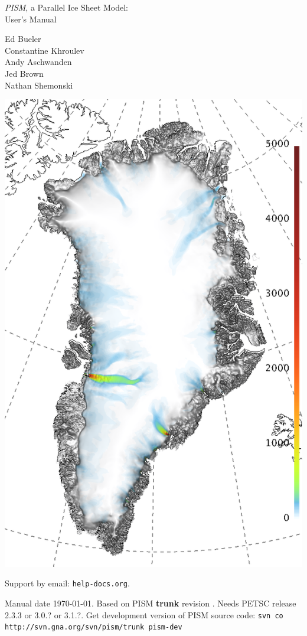 \documentclass[titlepage,letterpaper,final]{scrartcl}
\newcommand{\PISMREV}{\textbf{trunk} revision }
\newcommand{\PETSCREL}{2.3.3 or 3.0.? or 3.1.?}
\newcommand{\PISMDOWNLOADMSG}{Get development version of PISM source code: \quad\texttt{svn co http://svn.gna.org/svn/pism/trunk pism-dev} \quad}
\begin{document}
\graphicspath{{figs/}}

\begin{titlepage}
  \begin{center}
    {\huge{} \emph{PISM}, a Parallel Ice Sheet Model:\\\medskip User's Manual}
    \vspace{1cm}

    {\Large Ed Bueler \\ Constantine Khroulev \\ Andy Aschwanden \\ Jed Brown \\ Nathan Shemonski}
    \vspace{1cm}

    \includegraphics[width=3.in,keepaspectratio=true]{grn-grl-csurf}
    \vfill

    \small Support by email: \texttt{help\@@pism-docs.org}. 

    Manual date \today. Based on PISM \PISMREV.  Needs PETSC release \PETSCREL. \PISMDOWNLOADMSG
  \end{center}
\end{titlepage}
\end{document}
